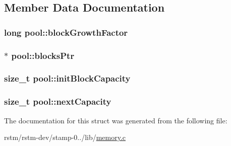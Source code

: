 \subsection{Member Data Documentation}
\hypertarget{structpool_ab15e0cf0b2ccfa137f98503466fa9f86}{
\subsubsection[{block\-Growth\-Factor}]{\setlength{\rightskip}{0pt plus 5cm}long pool\-::block\-Growth\-Factor}}\label{structpool_ab15e0cf0b2ccfa137f98503466fa9f86}
\hypertarget{structpool_a1459a2771d2d6d0e733ee34e34e357a8}{
\subsubsection[{blocks\-Ptr}]{$\ast$ pool\-::blocks\-Ptr}}\label{structpool_a1459a2771d2d6d0e733ee34e34e357a8}
\hypertarget{structpool_a070e5eeea97285beeb96302e8ae39f06}{
\subsubsection[{init\-Block\-Capacity}]{\setlength{\rightskip}{0pt plus 5cm}size\-\_\-t pool\-::init\-Block\-Capacity}}\label{structpool_a070e5eeea97285beeb96302e8ae39f06}
\hypertarget{structpool_aa0f4dd40fca5cddbc2f808243abec4ba}{
\subsubsection[{next\-Capacity}]{\setlength{\rightskip}{0pt plus 5cm}size\-\_\-t pool\-::next\-Capacity}}\label{structpool_aa0f4dd40fca5cddbc2f808243abec4ba}


The documentation for this struct was generated from the following file\-:\begin{DoxyCompactItemize}
\item 
rstm/rstm-\/dev/stamp-\/0../lib/\hyperlink{memory_8c}{memory.\-c}\end{DoxyCompactItemize}
